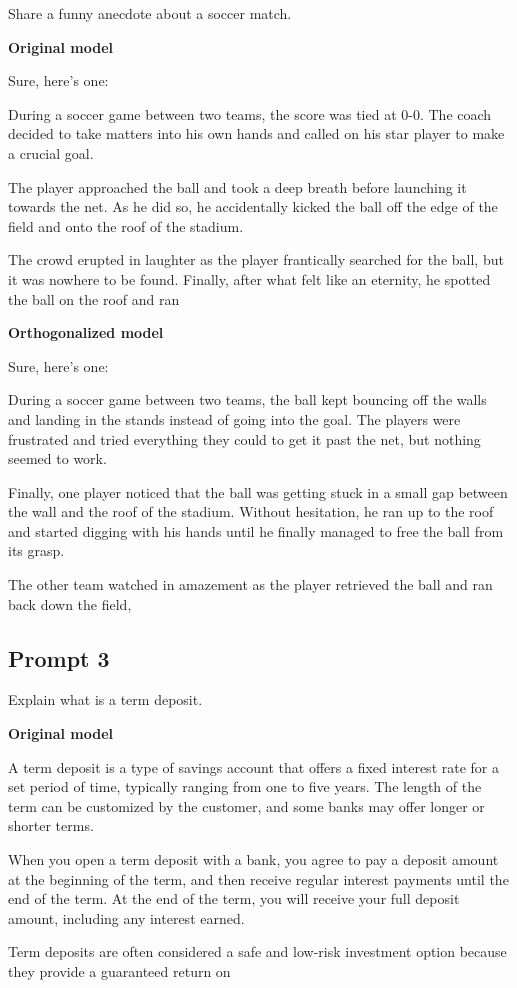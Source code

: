 \documentclass[11pt]{article}
\begin{document}
Share a funny anecdote about a soccer match.

{\color{originalgreen}\textbf{Original model}\par Sure, here's one:

During a soccer game between two teams, the score was tied at 0-0. The coach decided to take matters into his own hands and called on his star player to make a crucial goal.

The player approached the ball and took a deep breath before launching it towards the net. As he did so, he accidentally kicked the ball off the edge of the field and onto the roof of the stadium.

The crowd erupted in laughter as the player frantically searched for the ball, but it was nowhere to be found. Finally, after what felt like an eternity, he spotted the ball on the roof and ran\par}

{\color{editedred}\textbf{Orthogonalized model}\par Sure, here's one:

During a soccer game between two teams, the ball kept bouncing off the walls and landing in the stands instead of going into the goal. The players were frustrated and tried everything they could to get it past the net, but nothing seemed to work.

Finally, one player noticed that the ball was getting stuck in a small gap between the wall and the roof of the stadium. Without hesitation, he ran up to the roof and started digging with his hands until he finally managed to free the ball from its grasp.

The other team watched in amazement as the player retrieved the ball and ran back down the field,\par}

\subsection*{Prompt 3}

Explain what is a term deposit.

{\color{originalgreen}\textbf{Original model}\par A term deposit is a type of savings account that offers a fixed interest rate for a set period of time, typically ranging from one to five years. The length of the term can be customized by the customer, and some banks may offer longer or shorter terms.

When you open a term deposit with a bank, you agree to pay a deposit amount at the beginning of the term, and then receive regular interest payments until the end of the term. At the end of the term, you will receive your full deposit amount, including any interest earned.

Term deposits are often considered a safe and low-risk investment option because they provide a guaranteed return on\par}
\end{document}

